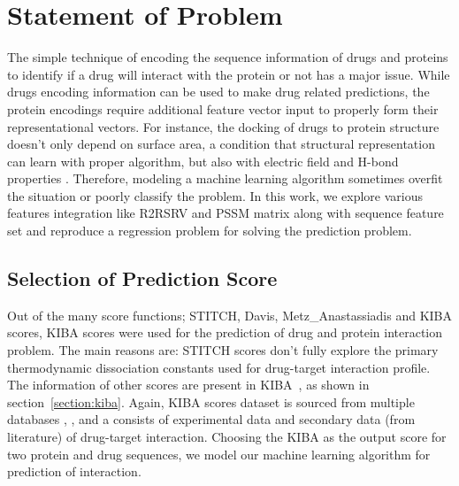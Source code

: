 \iffalse

For citations, use the function \textbackslash cite. \citep{gowar1989power} The references file is the sample.bib one. Google Scholar provides almost all the references in LaTeX form.

To insert a footnote, use the following command. \footnote{This is a footnote.} When necessary to use a nomenclature, define it on the same page for a better organization. Don't create NSN (Non-sense nomenclatures).

For figures, tables, equations and further information, open the file "tips.tex". If what you need is not found there, Google it.

\fi
 
\section{Statement of Problem}
The simple technique of encoding the sequence information of drugs and proteins to identify if a drug will interact with the protein or not has a major issue. While drugs encoding information can be used to make drug related predictions, the protein encodings require additional feature vector input to properly form their representational vectors. For instance, the docking of drugs to protein structure doesn't only depend on surface area, a condition that structural representation can learn with proper algorithm, but also with electric field and H-bond properties \citep{Wong2018}. Therefore, modeling a machine learning algorithm sometimes overfit the situation or poorly classify the problem. In this work, we explore various features integration like R2RSRV and PSSM matrix along with sequence feature set and reproduce a regression problem for solving the prediction problem.

\subsection{Selection of Prediction Score}

Out of the many score functions; STITCH, Davis, Metz\_Anastassiadis and KIBA scores, KIBA scores were used for the prediction of drug and protein interaction problem. The main reasons are: STITCH scores don't fully explore the primary thermodynamic dissociation constants used for drug-target interaction profile. The information of other scores are present in KIBA~\citep{Tang2013}, as shown in section~\ref{section:kiba}. Again, KIBA scores dataset is sourced from multiple databases \citep{Kanehisa2000}, \citep{Wishart2018}, \citep{Hecker2012} and \citep{Sharma2010} a consists of experimental data and secondary data (from literature) of drug-target interaction. Choosing the KIBA as the output score for two protein and drug sequences, we model our machine learning algorithm for prediction of interaction.


